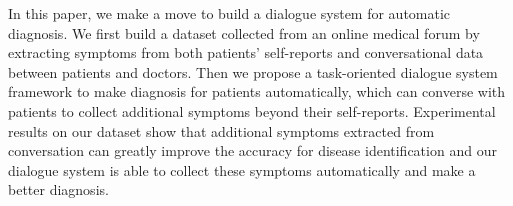 In this paper, we make a move to build a dialogue system for automatic diagnosis. We first build a dataset collected from an online medical forum by extracting symptoms from both patients' self-reports and conversational data between patients and doctors. Then we propose a task-oriented dialogue system framework to make diagnosis for patients automatically, which can converse with patients to collect additional symptoms beyond their self-reports. Experimental results on our dataset show that additional symptoms extracted from conversation can greatly improve the accuracy for disease identification and our dialogue system is able to collect these symptoms automatically and make a better diagnosis.

